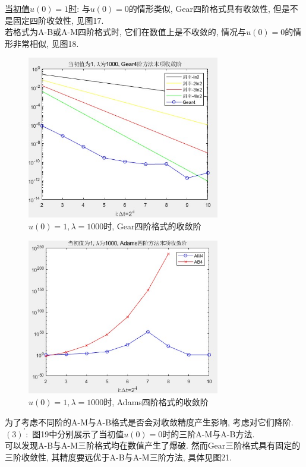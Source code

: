 \documentclass[12pt]{article}
\begin{document}
\noindent \underline{当初值$u(0)=1$时}: 与$u(0)=0$的情形类似, Gear四阶格式具有收敛性, 但是不是固定四阶收敛性, 见图17. \\
若格式为A-B或A-M四阶格式时, 它们在数值上是不收敛的, 情况与$u(0)=0$的情形非常相似, 见图18.
\begin{figure}[H]
	\centering
	\includegraphics[width=0.75\textwidth]{17}
	\caption{$u(0)=1, \lambda=1000$时, Gear四阶格式的收敛阶}
\end{figure}
\begin{figure}[H]
	\centering
	\includegraphics[width=0.75\textwidth]{18}
	\caption{$u(0)=1, \lambda=1000$时, Adams四阶格式的收敛阶}
\end{figure}
\noindent 为了考虑不同阶的A-M与A-B格式是否会对收敛精度产生影响, 考虑对它们降阶.\\
$(3)^{'}:$ 图19中分别展示了当初值$u(0)=0$时的三阶A-M与A-B方法.\\
可以发现A-B与A-M三阶格式均在数值产生了爆破. 然而Gear三阶格式具有固定的三阶收敛性, 其精度要远优于A-B与A-M三阶方法, 具体见图21.\\
\end{document}
